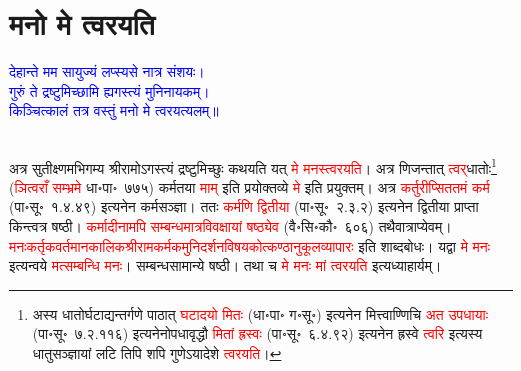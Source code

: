 \section[मनो मे त्वरयति]{मनो मे त्वरयति}
\centering\textcolor{blue}{देहान्ते मम सायुज्यं लप्स्यसे नात्र संशयः।\nopagebreak\\
गुरुं ते द्रष्टुमिच्छामि ह्यगस्त्यं मुनिनायकम्।\nopagebreak\\
किञ्चित्कालं तत्र वस्तुं मनो मे त्वरयत्यलम्॥}\nopagebreak\\
\\
\begin{sloppypar}\justifying\noindent\hspace{10mm} अत्र सुतीक्ष्णमभिगम्य श्रीरामोऽगस्त्यं द्रष्टुमिच्छुः कथयति यत् \textcolor{red}{मे मनस्त्वरयति}। अत्र णिजन्तात् \textcolor{red}{त्वर्‌}\-धातोः\footnote{अस्य धातोर्घटाद्यन्तर्गणे पाठात् \textcolor{red}{घटादयो मितः} (धा॰पा॰ ग॰सू॰) इत्यनेन मित्त्वाण्णिचि \textcolor{red}{अत उपधायाः} (पा॰सू॰~७.२.११६) इत्यनेनोपधा\-वृद्धौ \textcolor{red}{मितां ह्रस्वः} (पा॰सू॰~६.४.९२) इत्यनेन ह्रस्वे \textcolor{red}{त्वरि} इत्यस्य धातु\-सञ्ज्ञायां लटि तिपि शपि गुणेऽयादेशे \textcolor{red}{त्वरयति}।} (\textcolor{red}{ञित्वराँ सम्भ्रमे} धा॰पा॰~७७५) कर्मतया \textcolor{red}{माम्‌} इति प्रयोक्तव्ये \textcolor{red}{मे} इति प्रयुक्तम्। अत्र \textcolor{red}{कर्तुरीप्सित\-तमं कर्म} (पा॰सू॰~१.४.४९) इत्यनेन कर्म\-सञ्ज्ञा। ततः \textcolor{red}{कर्मणि द्वितीया} (पा॰सू॰~२.३.२) इत्यनेन द्वितीया प्राप्ता किन्त्वत्र षष्ठी। \textcolor{red}{कर्मादीनामपि सम्बन्ध\-मात्र\-विवक्षायां षष्ठ्येव} (वै॰सि॰कौ॰~६०६) तथैवात्राप्येवम्। \textcolor{red}{मनः\-कर्तृक\-वर्तमान\-कालिक\-श्रीराम\-कर्मक\-मुनि\-दर्शन\-विषयकोत्कण्ठानुकूल\-व्यापारः} इति शाब्दबोधः। यद्वा \textcolor{red}{मे मनः} इत्यन्वये \textcolor{red}{मत्सम्बन्धि मनः}।
सम्बन्ध\-सामान्ये षष्ठी। तथा च \textcolor{red}{मे मनः मां त्वरयति} इत्यध्याहार्यम्।\end{sloppypar}
